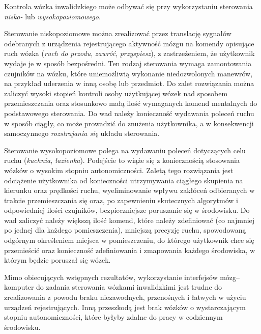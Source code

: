 \documentclass[skorowidz,skroty]{dyplomWEZUT}
\begin{document}
Kontrola wózka inwalidzkiego może odbywać się przy wykorzystaniu sterowania \textit{nisko-} lub \textit{wysokopoziomowego}.

Sterowanie niskopoziomowe można zrealizować przez translację sygnałów odebranych z urządzenia rejestrującego aktywność mózgu na komendy opisujące ruch wózka (\textit{ruch do przodu}, \textit{zawróć}, \textit{przyspiesz}), z zastrzeżeniem, że użytkownik wydaje je w sposób bezpośredni. Ten rodzaj sterowania wymaga zamontowania czujników na wózku, które uniemożliwią wykonanie niedozwolonych manewrów, na przykład uderzenia w inną osobę lub przedmiot. Do zalet rozwiązania można zaliczyć wysoki stopień kontroli osoby użytkującej wózek nad sposobem przemieszczania oraz stosunkowo małą ilość wymaganych komend mentalnych do podstawowego sterowania. Do wad należy konieczność wydawania poleceń ruchu w sposób ciągły, co może prowadzić do znużenia użytkownika, a w konsekwencji samoczynnego \textit{rozstrajania się} układu sterowania.

Sterowanie wysokopoziomowe polega na wydawaniu poleceń dotyczących celu ruchu (\textit{kuchnia}, \textit{łazienka}). Podejście to wiąże się z koniecznością stosowania wózków o wysokim stopniu autonomiczności. Zaletą tego rozwiązania jest odciążenie użytkownika od konieczności utrzymywania ciągłego skupienia na kierunku oraz prędkości ruchu, wyeliminowanie wpływu zakłóceń odbieranych w trakcie przemieszczania się oraz, po zapewnieniu skutecznych algorytmów i odpowiedniej ilości czujników, bezpieczniejsze poruszanie się w środowisku. Do wad zaliczyć należy większą ilość komend, które należy zdefiniować (co najmniej po jednej dla każdego pomieszczenia), mniejszą precyzję ruchu, spowodowaną odgórnym określeniem miejsca w pomieszczeniu, do którego użytkownik chce się przemieścić oraz konieczność zdefiniowania i zmapowania każdego środowiska, w którym będzie poruszał się wózek.

Mimo obiecujących wstępnych rezultatów, wykorzystanie interfejsów mózg--kom\-pu\-ter do zadania sterowania wózkami inwalidzkimi jest trudne do zrealizowania z powodu braku niezawodnych, przenośnych i łatwych w użyciu urządzeń rejestrujących. Inną przeszkodą jest brak wózków o wystarczającym stopniu autonomiczności, które byłyby zdalne do pracy w codziennym środowisku\cite{bci_introduction}.
\end{document}
